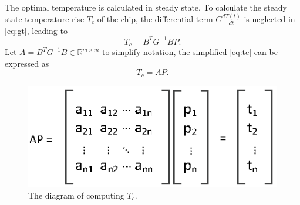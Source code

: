 

The optimal temperature is calculated in steady state. To calculate the steady state temperature rise $T_{c}$ of the chip, the differential term $C\frac{dT(t)}{dt}$ is neglected in 
\eqref{eq:gt}, leading to
\begin{equation}\label{eq:tc}
T_{c} = B^{T}G^{-1}BP.
\end{equation}
Let $A = B^{T}G^{-1}B \in \mathbb{R}^{m \times m}$ to simplify notation, the simplified 
\eqref{eq:tc} can be expressed as
\begin{equation}\label{sim_tc}
T_{c} = AP.
\end{equation}

\begin{figure}
\centering
\includegraphics[width=0.7\linewidth]{fig/ap.eps}
\caption{The diagram of computing $T_{c}$.}
\label{fig:apt}
\end{figure}


